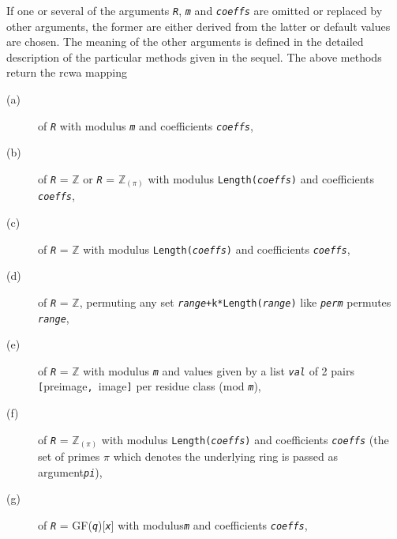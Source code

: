 \documentclass[a4paper,11pt]{report}
\begin{document}
{{{ If one or several of the arguments \mbox{\texttt{\mdseries\slshape R}}, \mbox{\texttt{\mdseries\slshape m}} and \mbox{\texttt{\mdseries\slshape coeffs}} are omitted or replaced by other arguments, the former are either derived from
the latter or default values are chosen. The meaning of the other arguments is
defined in the detailed description of the particular methods given in the
sequel. The above methods return the rcwa mapping 
\begin{description}
\item[{(a)}]  of \mbox{\texttt{\mdseries\slshape R}} with modulus \mbox{\texttt{\mdseries\slshape m}} and coefficients \mbox{\texttt{\mdseries\slshape coeffs}}, 
\item[{(b)}]  of \mbox{\texttt{\mdseries\slshape R}} = {\ensuremath{\mathbb Z}} or \mbox{\texttt{\mdseries\slshape R}} = ${\ensuremath{\mathbb Z}}_{(\pi)}$ with modulus \texttt{Length(\mbox{\texttt{\mdseries\slshape coeffs}})} and coefficients \mbox{\texttt{\mdseries\slshape coeffs}}, 
\item[{(c)}]  of \mbox{\texttt{\mdseries\slshape R}} = {\ensuremath{\mathbb Z}} with modulus \texttt{Length(\mbox{\texttt{\mdseries\slshape coeffs}})} and coefficients \mbox{\texttt{\mdseries\slshape coeffs}}, 
\item[{(d)}]  of \mbox{\texttt{\mdseries\slshape R}} = {\ensuremath{\mathbb Z}}, permuting any set \texttt{\mbox{\texttt{\mdseries\slshape range}}+k*Length(\mbox{\texttt{\mdseries\slshape range}})} like \mbox{\texttt{\mdseries\slshape perm}} permutes \mbox{\texttt{\mdseries\slshape range}}, 
\item[{(e)}]  of \mbox{\texttt{\mdseries\slshape R}} = {\ensuremath{\mathbb Z}} with modulus \mbox{\texttt{\mdseries\slshape m}} and values given by a list \mbox{\texttt{\mdseries\slshape val}} of 2 pairs \texttt{[}preimage\texttt{, }image\texttt{]} per residue class (mod \mbox{\texttt{\mdseries\slshape m}}), 
\item[{(f)}]  of \mbox{\texttt{\mdseries\slshape R}} = ${\ensuremath{\mathbb Z}}_{(\pi)}$ with modulus \texttt{Length(\mbox{\texttt{\mdseries\slshape coeffs}})} and coefficients \mbox{\texttt{\mdseries\slshape coeffs}} (the set of primes $\pi$ which denotes the underlying ring is passed as argument{\nobreakspace}\mbox{\texttt{\mdseries\slshape pi}}), 
\item[{(g)}]  of \mbox{\texttt{\mdseries\slshape R}} = GF(\mbox{\texttt{\mdseries\slshape q}})[\mbox{\texttt{\mdseries\slshape x}}] with modulus{\nobreakspace}\mbox{\texttt{\mdseries\slshape m}} and coefficients \mbox{\texttt{\mdseries\slshape coeffs}}, 

\end{description}}}}
\end{document}
